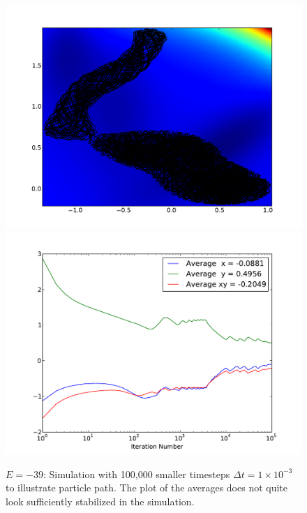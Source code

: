 \documentclass[letterpaper]{article}
\begin{document}
\begin{figure}[p]
\begin{center}
\includegraphics[width=5in]{t1.pdf}
\includegraphics[width=5in]{t1a.pdf}
\end{center}
\caption{$E=-39$: Simulation with 100,000 smaller timesteps $\Delta
t=1\times10^{-3}$ to illustrate
particle path. The plot of the averages does not quite look sufficiently
stabilized in the simulation.}
\label{fig:t1}
\end{figure}
\end{document}
